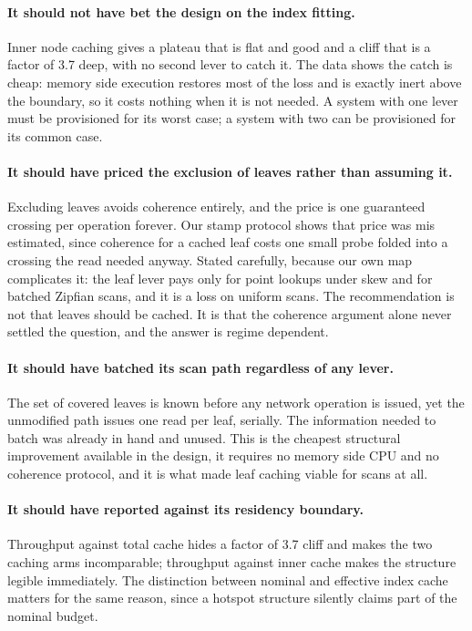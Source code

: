 \documentclass[sigconf,nonacm]{acmart}
\begin{document}
\paragraph{It should not have bet the design on the index fitting.}
Inner node caching gives a plateau that is flat and good and a cliff that is a
factor of 3.7 deep, with no second lever to catch it. The data shows the catch is
cheap: memory side execution restores most of the loss and is exactly inert above
the boundary, so it costs nothing when it is not needed. A system with one lever
must be provisioned for its worst case; a system with two can be provisioned for
its common case.

\paragraph{It should have priced the exclusion of leaves rather than assuming it.}
Excluding leaves avoids coherence entirely, and the price is one guaranteed
crossing per operation forever. Our stamp protocol shows that price was
mis estimated, since coherence for a cached leaf costs one small probe folded into
a crossing the read needed anyway. Stated carefully, because our own map
complicates it: the leaf lever pays only for point lookups under skew and for
batched Zipfian scans, and it is a loss on uniform scans. The recommendation is
not that leaves should be cached. It is that the coherence argument alone never
settled the question, and the answer is regime dependent.

\paragraph{It should have batched its scan path regardless of any lever.}
The set of covered leaves is known before any network operation is issued, yet the
unmodified path issues one read per leaf, serially. The information needed to
batch was already in hand and unused. This is the cheapest structural improvement
available in the design, it requires no memory side CPU and no coherence protocol,
and it is what made leaf caching viable for scans at all.

\paragraph{It should have reported against its residency boundary.}
Throughput against total cache hides a factor of 3.7 cliff and makes the two
caching arms incomparable; throughput against inner cache makes the structure
legible immediately. The distinction between nominal and effective index cache
matters for the same reason, since a hotspot structure silently claims part of the
nominal budget.
\end{document}
